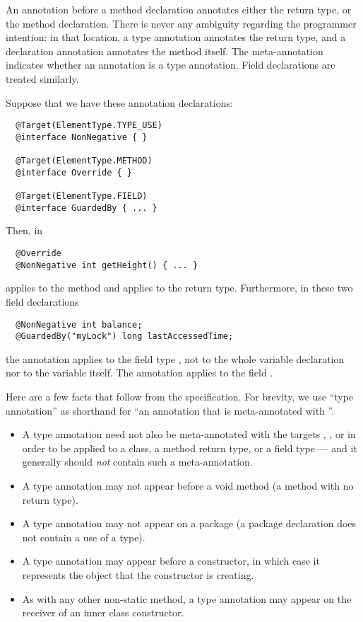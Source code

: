 \documentclass[10pt]{article}
\begin{document}
An annotation before a method declaration annotates either the return type,
or the method declaration.  There is never any ambiguity regarding the
programmer intention:  in that location, a type annotation annotates the
return type, and a declaration annotation annotates the method itself.  The
 meta-annotation indicates whether an annotation is a type
annotation.  Field declarations are treated similarly.



Suppose that we have these annotation declarations:
\begin{Verbatim}
  @Target(ElementType.TYPE_USE)
  @interface NonNegative { }

  @Target(ElementType.METHOD)
  @interface Override { }

  @Target(ElementType.FIELD)
  @interface GuardedBy { ... }
\end{Verbatim}
Then, in
\begin{Verbatim}
  @Override
  @NonNegative int getHeight() { ... }
\end{Verbatim}
 applies to the method and  applies
to the return type.
Furthermore, in these two field declarations
\begin{Verbatim}
  @NonNegative int balance;
  @GuardedBy("myLock") long lastAccessedTime;
\end{Verbatim}
the annotation  applies to the field type ,
not to the whole variable declaration nor to the variable 
itself.  The annotation  applies to the
field .

Here are a few facts that follow from the specification.  For brevity, we
use ``type annotation'' as shorthand for ``an annotation that is
meta-annotated with ''.
\begin{itemize}
\item
A type
annotation need not also be meta-annotated with the targets
, , or
 in order to be applied to a class, a method return
type, or a field type --- and it generally should \emph{not} contain such a
 meta-annotation.
\item
  A type annotation may not appear before a void method (a method with no
  return type).
\item
  A type annotation may not appear on a package (a package declaration does
  not contain a use of a type).
\item
  A type annotation may appear before a constructor, in which case it
  represents the object that the constructor is creating.
\item
  As with any other non-static method, a type annotation may
  appear on the receiver of an inner class constructor.
\end{itemize}
\end{document}

